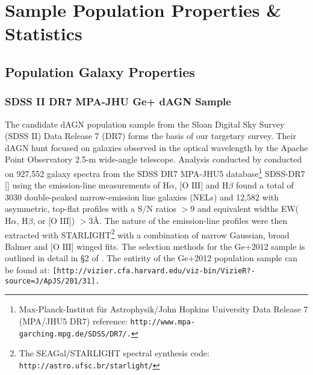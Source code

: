 \section{Sample Population Properties \& Statistics}
\subsection{Population Galaxy Properties}
\subsubsection{SDSS II DR7 MPA-JHU Ge+ dAGN Sample}

The \cite{Ge_Hu_Wang_Bai_Zhang_2012} candidate dAGN population sample from the Sloan Digital Sky Survey (SDSS II) Data Release 7 (DR7) forms the basis of our targetary survey. Their dAGN hunt focused on galaxies observed in the optical wavelength by the Apache Point Observatory 2.5-m wide-angle telescope. Analysis conducted by \cite{Ge_Hu_Wang_Bai_Zhang_2012} conducted on 927,552 galaxy spectra from the SDSS DR7 MPA-JHU5 database\footnote{\tiny{Max-Planck-Institut für Astrophysik/John Hopkins University Data Release 7 (MPA/JHU5 DR7) reference: \tt{http://www.mpa-garching.mpg.de/SDSS/DR7/}.}} SDSS-DR7 [\cite{2009ApJS..182..543A}] using the emission-line measurements of $\text{H}\alpha$, $\text{[O III]}$ and $\text{H}\beta$ found a total of 3030 double-peaked narrow-emission line galaxies (NELs) and 12,582 with asymmetric, top-ﬂat proﬁles with a $\text{S/N}$ ratios ${>}{9}$ and equivalent widths EW($\text{H}\alpha$, $\text{H}\beta$, or $\text{[O III]}$) ${>}{3}$\AA. The nature of the emission-line profiles were then extracted with STARLIGHT\footnote{\tiny{The SEAGal/STARLIGHT spectral synthesis code: \tt{http://astro.ufsc.br/starlight/}}} with a combination of narrow Gaussian, broad Balmer and $\text{[O III]}$ winged fits. The selection methods for the Ge+2012 sample is outlined in detail in §2 of \cite{Ge_Hu_Wang_Bai_Zhang_2012}. The entirity of the Ge+2012 population sample can be found at: \tt{[http://vizier.cfa.harvard.edu/viz-bin/VizieR?-source=J/ApJS/201/31]}.

